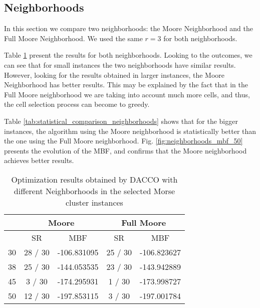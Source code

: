 		\subsection{Neighborhoods}
		
		In this section we compare two neighborhoods: the Moore Neighborhood and the Full Moore Neighborhood. We used the same $r = 3$ for both neighborhoods.
		
		Table \ref{tab:neighborhood_results} present the results for both neighborhoods. Looking to the outcomes, we can see that for small instances the two neighborhoods have similar results. However, looking for the results obtained in larger instances, the Moore Neighborhood has better results. This may be explained by the fact that in the Full Moore neighborhood we are taking into account much more cells, and thus, the cell selection process can become to greedy. 
		
		Table \ref{tab:statistical_comparison_neighborhoods} shows that for the bigger instances, the algorithm using the Moore neighborhood is statistically better than the one using the Full Moore neighborhood. Fig. \ref{fig:neighborhoods_mbf_50} presents the evolution of the MBF, and confirms that the Moore neighborhood achieves better results. 
		
		\begin{table}[!htdp]
				\begin{center}
					\begin{tabular}{| c | c | c | c | c |}
						\hline
						~ & \multicolumn{2}{c|}{\textbf{Moore}} & \multicolumn{2}{c|}{\textbf{Full Moore}} \\ \hline
						~ & SR & MBF & SR & MBF \\ \hline
						30 & 28 / 30 & -106.831095 & 25 / 30 & -106.823627 \\ \hline
						38 & 25 / 30 & -144.053535 & 23 / 30 & -143.942889 \\ \hline
						45 & 3 / 30 & -174.295931 &  1 / 30 &  -173.998727 \\ \hline
						50 & 12 / 30 & -197.853115 & 3 / 30 &  -197.001784 \\ \hline
					\end{tabular}
					\caption{Optimization results obtained by DACCO with different Neighborhoods in the selected Morse cluster instances}
					\label{tab:neighborhood_results}
				\end{center}
		\end{table}
		
